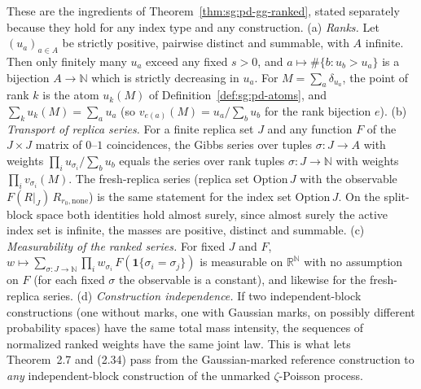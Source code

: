 \begin{lemma}\label{lem:sg:pd-rank-transport}
  \leanok
These are the ingredients of Theorem~\ref{thm:sg:pd-gg-ranked}, stated separately because they hold for any index type and any construction.
(a) \emph{Ranks.} Let $(u_a)_{a\in A}$ be strictly positive, pairwise distinct and summable, with $A$ infinite. Then only finitely many $u_a$ exceed any fixed $s>0$, and $a\mapsto\#\{b:u_b>u_a\}$ is a bijection $A\to\mathbb N$ which is strictly decreasing in $u_a$. For $M=\sum_a\delta_{u_a}$, the point of rank $k$ is the atom $u_k(M)$ of Definition~\ref{def:sg:pd-atoms}, and $\sum_ku_k(M)=\sum_au_a$ (so $v_{e(a)}(M)=u_a/\sum_bu_b$ for the rank bijection $e$).
(b) \emph{Transport of replica series.} For a finite replica set $J$ and any function $F$ of the $J\times J$ matrix of $0$--$1$ coincidences, the Gibbs series over tuples $\sigma:J\to A$ with weights $\prod_iu_{\sigma_i}/\sum_bu_b$ equals the series over rank tuples $\sigma:J\to\mathbb N$ with weights $\prod_iv_{\sigma_i}(M)$. The fresh-replica series (replica set $\mathrm{Option}\,J$ with the observable $F(R|_J)\,R_{r_0,\mathrm{none}}$) is the same statement for the index set $\mathrm{Option}\,J$. On the split-block space both identities hold almost surely, since almost surely the active index set is infinite, the masses are positive, distinct and summable.
(c) \emph{Measurability of the ranked series.} For fixed $J$ and $F$, $w\mapsto\sum_{\sigma:J\to\mathbb N}\prod_iw_{\sigma_i}\,F(\mathbf 1\{\sigma_i=\sigma_j\})$ is measurable on $\mathbb R^{\mathbb N}$ with no assumption on $F$ (for each fixed $\sigma$ the observable is a constant), and likewise for the fresh-replica series.
(d) \emph{Construction independence.} If two independent-block constructions (one without marks, one with Gaussian marks, on possibly different probability spaces) have the same total mass intensity, the sequences of normalized ranked weights have the same joint law. This is what lets Theorem~2.7 and (2.34) pass from the Gaussian-marked reference construction to \emph{any} independent-block construction of the unmarked $\zeta$-Poisson process.
\end{lemma}
